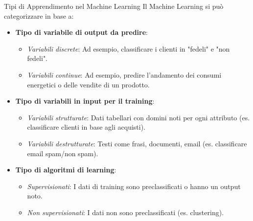 \documentclass{article}
\begin{document}
\begin{notebox}{Tipi di Apprendimento nel Machine Learning}
    Il Machine Learning si può categorizzare in base a:
    \begin{itemize}
        \item \textbf{Tipo di variabile di output da predire}:
              \begin{itemize}
                  \item \textit{Variabili discrete}: Ad esempio, classificare i clienti in "fedeli" e "non fedeli".
                  \item \textit{Variabili continue}: Ad esempio, predire l'andamento dei consumi energetici o delle vendite di un prodotto.
              \end{itemize}
        \item \textbf{Tipo di variabili in input per il training}:
              \begin{itemize}
                  \item \textit{Variabili strutturate}: Dati tabellari con domini noti per ogni attributo (es. classificare clienti in base agli acquisti).
                  \item \textit{Variabili destrutturate}: Testi come frasi, documenti, email (es. classificare email spam/non spam).
              \end{itemize}
        \item \textbf{Tipo di algoritmi di learning}:
              \begin{itemize}
                  \item \textit{Supervisionati}: I dati di training sono preclassificati o hanno un output noto.
                  \item \textit{Non supervisionati}: I dati non sono preclassificati (es. clustering).
              \end{itemize}
    \end{itemize}
\end{notebox}
\end{document}
